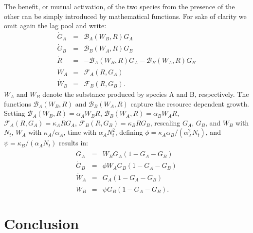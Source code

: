 \documentclass[10pt,A4paper]{article}
\begin{document}
The benefit, or mutual activation, of the two species from the presence of the other can be simply introduced by mathematical functions. 
For sake of clarity we omit again the lag pool and write:
\begin{eqnarray}
\dot{G}_A &=& \mathcal{B}_A(W_B,R)G_A\\
\dot{G}_B &=& \mathcal{B}_B(W_A,R)G_B\\
\dot{R} &=&-\mathcal{B}_A(W_B,R)G_A-\mathcal{B}_B(W_A,R)G_B\\
\dot{W}_A &=& \mathcal{F}_A(R,G_A)\\
\dot{W}_B &=& \mathcal{F}_B(R,G_B).
\end{eqnarray}
$W_A$ and $W_B$ denote the substance produced by species A and B, respectively. The functions $\mathcal{B}_A(W_B,R)$ and $\mathcal{B}_B(W_A,R)$ capture the resource dependent growth. Setting $\mathcal{B}_A(W_B,R)=\alpha_A W_BR$, $\mathcal{B}_B(W_A,R)=\alpha_B W_AR$, $\mathcal{F}_A(R,G_A)=\kappa_A RG_A$, $\mathcal{F}_B(R,G_B)=\kappa_B RG_B$, rescaling $G_A$, $G_B$, and $W_B$ with $N_t$, $W_A$ with $\kappa_A/\alpha_A$, time with $\alpha_AN_t^2$, defining $\phi=\kappa_A\alpha_B/(\alpha_A^2N_t)$, and $\psi=\kappa_B/(\alpha_A N_t)$ results in: 
\begin{eqnarray}
\dot{G}_A &=& W_BG_A\left(1 - G_A-G_B\right )\\
\dot{G}_B &=& \phi W_AG_B\left(1 - G_A-G_B\right )\\
\dot{W}_A &=& G_A\left(1 - G_A-G_B\right )\\
\dot{W}_B &=&\psi G_B\left(1 - G_A-G_B\right ).
\end{eqnarray}



\section{Conclusion}
\end{document}

